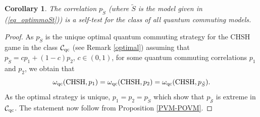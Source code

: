 \documentclass[11pt]{amsart}
\newtheorem{corollary}[theorem]{Corollary}
\theoremstyle{definition}
\newcommand{\cl}[1]{\mathcal{#1}}
\begin{document}
\begin{corollary}
The correlation $p_{\tilde S}$
(where $\tilde{S}$ is the model given in (\ref{eq_optimmoSt})) 
is a self-test for the class of all quantum commuting models.
\end{corollary}

\begin{proof}
    As $p_{\tilde S}$ is the unique 
    optimal quantum commuting strategy for the CHSH game in the class $\cl C_{\rm qc}$ (see Remark \ref{optimal}) 
    assuming that $p_{\tilde S} = cp_1+(1-c)p_2$, $c\in(0,1)$, for
    some quantum commuting correlations $p_1$ and $p_2$, we obtain that $$\omega_{\rm qc}({\rm CHSH},p_1) =\omega_{\rm qc}({\rm CHSH},p_2)=\omega_{\rm qc}({\rm CHSH}, p_{\tilde S}).$$ 
    As the optimal strategy is unique, $p_1=p_2=p_{\tilde S}$ which  show that $p_{\tilde{\cl  S}}$ is extreme in $\cl C_{\rm qc}$. The statement now follow from Proposition \ref{PVM-POVM}.
    \end{proof}
\end{document}

